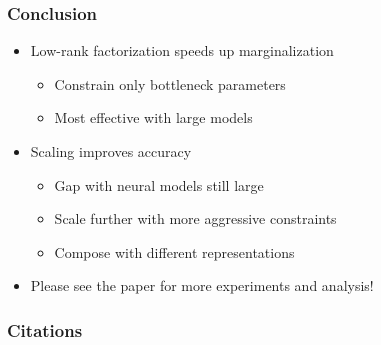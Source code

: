 \documentclass{beamer}
\begin{document}
\begin{frame}
\frametitle{Conclusion}
\begin{itemize}
\item Low-rank factorization speeds up marginalization
    \begin{itemize}
    \item Constrain only bottleneck parameters
    \item Most effective with large models
    \end{itemize}
\vspace{1em}
\item Scaling improves accuracy
    \begin{itemize}
    \item Gap with neural models still large
    \item Scale further with more aggressive constraints
    \item Compose with different representations
    \end{itemize}
\vspace{1em}
\item Please see the paper for more experiments and analysis!
\end{itemize}
\end{frame}


\begin{frame}[allowframebreaks]
\frametitle{Citations}
\printbibliography
\end{frame}
\end{document}
